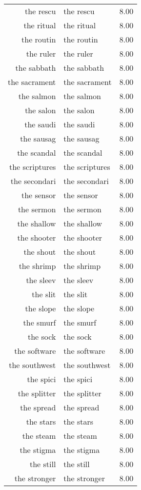 \begin{table}[ht]
\begin{tabular}{rlr}
  the rescu & the rescu & 8.00 \\ 
  the ritual & the ritual & 8.00 \\ 
  the routin & the routin & 8.00 \\ 
  the ruler & the ruler & 8.00 \\ 
  the sabbath & the sabbath & 8.00 \\ 
  the sacrament & the sacrament & 8.00 \\ 
  the salmon & the salmon & 8.00 \\ 
  the salon & the salon & 8.00 \\ 
  the saudi & the saudi & 8.00 \\ 
  the sausag & the sausag & 8.00 \\ 
  the scandal & the scandal & 8.00 \\ 
  the scriptures & the scriptures & 8.00 \\ 
  the secondari & the secondari & 8.00 \\ 
  the sensor & the sensor & 8.00 \\ 
  the sermon & the sermon & 8.00 \\ 
  the shallow & the shallow & 8.00 \\ 
  the shooter & the shooter & 8.00 \\ 
  the shout & the shout & 8.00 \\ 
  the shrimp & the shrimp & 8.00 \\ 
  the sleev & the sleev & 8.00 \\ 
  the slit & the slit & 8.00 \\ 
  the slope & the slope & 8.00 \\ 
  the smurf & the smurf & 8.00 \\ 
  the sock & the sock & 8.00 \\ 
  the software & the software & 8.00 \\ 
  the southwest & the southwest & 8.00 \\ 
  the spici & the spici & 8.00 \\ 
  the splitter & the splitter & 8.00 \\ 
  the spread & the spread & 8.00 \\ 
  the stars & the stars & 8.00 \\ 
  the steam & the steam & 8.00 \\ 
  the stigma & the stigma & 8.00 \\ 
  the still & the still & 8.00 \\ 
  the stronger & the stronger & 8.00 \\ 

\end{tabular}
\end{table}
